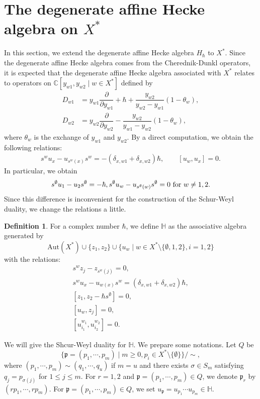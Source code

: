 \documentclass{article}
\theoremstyle{definition}
\newtheorem{Definition}[equation]{Definition}
\theoremstyle{remark}
\numberwithin{equation}{section}
\numberwithin{equation}{section}
\begin{document}
\section{The degenerate affine Hecke algebra on $X^*$}
In this section, we extend the degenerate affine Hecke algebra $H_\hbar$ to $X^*$. Since the degenerate affine Hecke algebra comes from the Cherednik-Dunkl operators, it is expected that the degenerate affine Hecke algebra associated with $X^*$ relates to operators on $\mathbb{C}[y_{w1},y_{w2}\mid w\in X^*]$ defined by
\begin{align*}
D_{w1}&=y_{w1}\dfrac{\partial}{\partial y_{w1}}+\hbar+\dfrac{y_{w2}}{y_{w2}-y_{w1}}(1-\theta_w),\\
D_{w2}&=y_{w2}\dfrac{\partial}{\partial y_{w2}}-\dfrac{y_{w2}}{y_{w1}-y_{w2}}(1-\theta_w),
\end{align*}
where $\theta_w$ is the exchange of $y_{w1}$ and $y_{w2}$. By a direct computation, we obtain the following relations:
\begin{gather*}
s^wu_x-u_{s^w(x)}s^w=-(\delta_{x,w1}+\delta_{x,w2})\hbar,\qquad 
[u_w,u_x]=0.
\end{gather*}
In particular, we obtain
\[
s^\emptyset u_1-u_2s^\emptyset=-\hbar,\\
s^\emptyset u_w-u_{s^\emptyset(w)}s^\emptyset=0\text{ for }w\neq1,2.
\]
Since this difference is inconvenient for the construction of the Schur-Weyl duality, we change the relations a little. 
\begin{Definition}
For a complex number $\hbar$, we define $\mathbb{H}$ as the associative algebra generated by 
\[\text{Aut}(X^*)\cup\{z_1,z_2\} \cup\{u_w\mid w\in X^*\setminus\{\emptyset,1,2\},i=1,2\}\]
with the relations:
\begin{gather}
s^wz_j-z_{s^w(j)}=0,\label{H1}\\
s^wu_x-u_{w(x)}s^w=(\delta_{x,w1}+\delta_{x,w2})\hbar,\label{H2}\\
[z_1,z_2-\hbar s^\emptyset]=0,\label{H3}\\
[u_w,z_j]=0,\label{H4}\\
[u^{w_1}_{i_1},u^{w_2}_{i_2}]=0.\label{H5}
\end{gather}
\end{Definition}
We will give the Shcur-Weyl duality for $\mathbb{H}$. We prepare some notations.
Let $Q$ be 
\[
\{\mathfrak{p}=(p_1,\cdots,p_m)\mid m\geq0,p_i\in X^*\setminus\{\emptyset\}\}/\sim,
\] 
where $(p_1,\cdots,p_m)\sim(q_1,\cdots,q_u)$ if $m=u$ and there exists $\sigma\in S_m$ satisfying $q_j=p_{\sigma(j)}$ for $1\leq j\leq m$. For $r=1,2$ and $\mathfrak{p}=(p_1,\cdots,p_m)\in Q$, we denote $\mathfrak{p}_r$ by $(rp_1,\cdots,rp_m)$. For $\mathfrak{p}=(p_1,\cdots,p_m)\in Q$, we set $u_{\mathfrak{p}}=u_{p_1}\cdots u_{p_m}\in\mathbb{H}$. 
\end{document}
